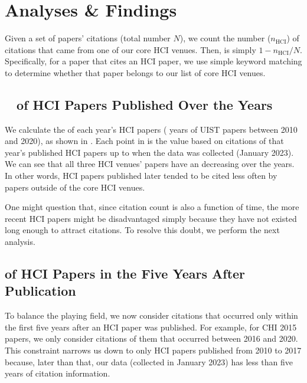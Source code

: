 \section{Analyses \& Findings}

Given a set of papers' citations (total number $N$), we count the number ($n_\text{HCI}$) of citations that came from one of our core HCI venues.
Then, \xin is simply $1-n_\text{HCI}/N$.
Specifically, for a paper that cites an HCI paper, we use simple keyword matching to determine whether that paper belongs to our list of core HCI venues.

\subsection{\xin~ of HCI Papers Published Over the Years}
We calculate the \xin of each year's HCI papers ( years of UIST papers between 2010 and 2020), as shown in .
Each point in  is the \xin value based on citations of that year's published HCI papers up to when the data was collected (January 2023).
We can see that all three HCI venues' papers have an decreasing \xin over the years.
In other words, HCI papers published later tended to be cited less often by papers outside of the core HCI venues.

One might question that, since citation count is also a function of time, the more recent HCI papers might be disadvantaged simply because they have not existed long enough to attract citations.
To resolve this doubt, we perform the next analysis.


\subsection{\xin of HCI Papers in the Five Years After Publication}
To balance the playing field, we now consider citations that occurred only within the first five years after an HCI paper was published.
For example, for CHI 2015 papers, we only consider citations of them that occurred between 2016 and 2020.
This constraint narrows us down to only HCI papers published from 2010 to 2017 because, later than that, our data (collected in January 2023) has less than five years of citation information.

